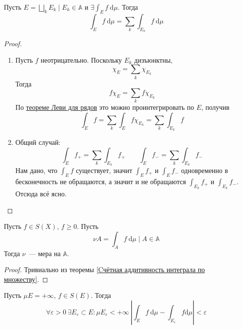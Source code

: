 \documentclass{article}
\let\eps\varepsilon
\begin{document}
    \begin{theorem}
        \label{Cчётная аддитивность интеграла по множеству}
        Пусть $E=\bigsqcup\limits_kE_k\mid E_k\in\mathbb A$ и $\exists\int_E f~\mathrm d\mu$. Тогда
        $$
        \int_E f~\mathrm d\mu=\sum\limits_k\int_{E_k}f~\mathrm d\mu
        $$
    \end{theorem}
    \begin{proof}
        \begin{enumerate}
            \item Пусть $f$ неотрицательно. Поскольку $E_k$ дизъюнктны,
            $$
            \chi_E=\sum\limits_k\chi_{E_k}
            $$
            Тогда
            $$
            f\chi_E=\sum\limits_kf\chi_{E_k}
            $$
            По \hyperref[Теорема Леви для рядов]{теореме Леви для рядов} это можно проинтегрировать по $E$, получив
            $$
            \int_Ef=\sum\limits_k\int_Ef\chi_{E_k}=\sum\limits_k\int_{E_k}f
            $$
            \item Общий случай:
            $$
            \int_Ef_+=\sum\limits_k\int_{E_k}f_+\qquad \int_Ef_-=\sum\limits_k\int_{E_k}f_-
            $$
            Нам дано, что $\int_Ef$ существует, значит $\int_Ef_+$ и $\int_Ef_-$ одновременно в бесконечность не обращаются, а значит и не обращаются $\int_{E_k}f_+$ и $\int_{E_k}f_-$. Отсюда всё ясно.
        \end{enumerate}
    \end{proof}
    \begin{corollary}
        Пусть $f\in S(X)$, $f\geqslant 0$. Пусть
        $$\nu A=\int_Af~\mathrm d\mu\mid A\in\mathbb A$$
        Тогда $\nu$~--- мера на $\mathbb A$.
    \end{corollary}
    \begin{proof}
        Тривиально из теоремы \ref{Cчётная аддитивность интеграла по множеству}.
    \end{proof}
    \begin{corollary}
        \label{Приближение интеграла интегралом по множеству конечной меры}
        Пусть $\mu E=+\infty$, $f\in S(E)$. Тогда
        $$
        \forall\eps>0~\exists E_\eps\subset E:\mu E_\eps<+\infty~\left|\int_Ef~\mathrm d\mu-\int_{E_\eps}f\mathrm d\mu\right|<\eps
        $$
    \end{corollary}
\end{document}
